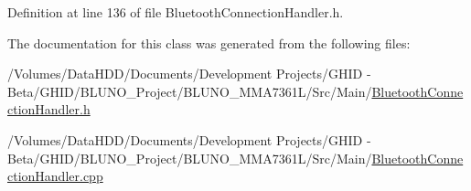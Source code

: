 \-Definition at line 136 of file \-Bluetooth\-Connection\-Handler.\-h.



\-The documentation for this class was generated from the following files\-:\begin{DoxyCompactItemize}
\item 
/\-Volumes/\-Data\-H\-D\-D/\-Documents/\-Development Projects/\-G\-H\-I\-D -\/ Beta/\-G\-H\-I\-D/\-B\-L\-U\-N\-O\-\_\-\-Project/\-B\-L\-U\-N\-O\-\_\-\-M\-M\-A7361\-L/\-Src/\-Main/\hyperlink{_bluetooth_connection_handler_8h}{\-Bluetooth\-Connection\-Handler.\-h}\item 
/\-Volumes/\-Data\-H\-D\-D/\-Documents/\-Development Projects/\-G\-H\-I\-D -\/ Beta/\-G\-H\-I\-D/\-B\-L\-U\-N\-O\-\_\-\-Project/\-B\-L\-U\-N\-O\-\_\-\-M\-M\-A7361\-L/\-Src/\-Main/\hyperlink{_bluetooth_connection_handler_8cpp}{\-Bluetooth\-Connection\-Handler.\-cpp}\end{DoxyCompactItemize}
